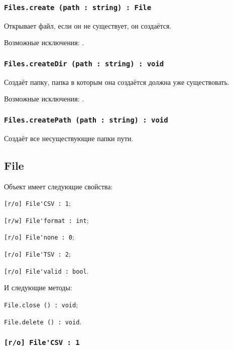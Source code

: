 \subsubsection{\lstinline|Files.create (path : string) : File|}

Открывает файл, если он не существует, он создаётся.

Возможные исключения: .

\subsubsection{\lstinline|Files.createDir (path : string) : void|}

Создаёт папку, папка в которым она создаётся должна уже существовать.

Возможные исключения: .

\subsubsection{\lstinline|Files.createPath (path : string) : void|}

Создаёт все несуществующие папки пути.

\subsection{{\color{orange} File}}

Объект \file{} имеет следующие свойства:
\begin{icItems}
	\item \lstinline|[r/o] File'CSV : 1|;
	\item \lstinline|[r/w] File'format : int|;
	\item \lstinline|[r/o] File'none : 0|;
	\item \lstinline|[r/o] File'TSV : 2|;
	\item \lstinline|[r/o] File'valid : bool|.
\end{icItems}

И следующие методы:
\begin{icItems}
	\item \lstinline|File.close () : void|;
	\item \lstinline|File.delete () : void|.
\end{icItems}

\subsubsection{\lstinline|[r/o] File'CSV : 1|}

